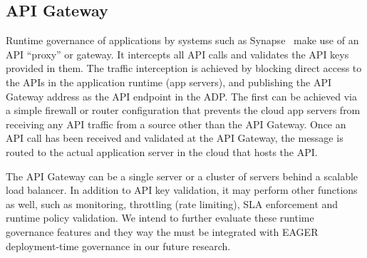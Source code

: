 \subsection{API Gateway} 
Runtime governance of applications by systems such as
Synapse~\cite{XXXSynapseXXX} make use of an API ``proxy'' or gateway.
It
intercepts all API calls and validates the API keys provided in them. The
traffic interception is achieved by blocking direct access to the APIs in the
application runtime (app servers), and publishing the API Gateway address as
the API endpoint in the ADP. The first can be achieved via a simple firewall
or router configuration that prevents the cloud app servers from receiving any
API traffic from a source other than the API Gateway. Once an API call has
been received and validated at the API Gateway, the message is routed to the
actual application server in the cloud that hosts the API.

The API Gateway can be a single server or a cluster of servers 
behind a scalable load balancer. %
In addition to API key validation, it may perform other
functions as well, such as monitoring, throttling (rate limiting), SLA
enforcement and runtime policy validation. We intend to further evaluate these
runtime governance features and they way the must be integrated with
EAGER deployment-time governance
in our future research.
